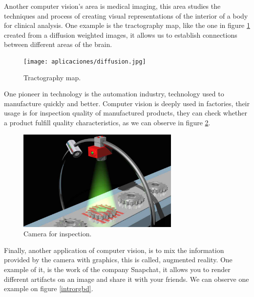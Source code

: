 Another computer vision's area is medical imaging, this area studies the techniques and process of creating visual representations of the interior of a body for clinical analysis. One example is the tractography map, like the one in figure \ref{introTractog} created from a diffusion weighted images, it allows us to establish connections between different areas of the brain.

\begin{figure}[H]
\centering         
\texttt{[image: aplicaciones/diffusion.jpg]}
\caption{Tractography map.} \label{introTractog}
\end{figure}


One pioneer in technology is the automation industry, technology used to manufacture quickly and better. Computer vision is deeply used in factories, their usage is for inspection quality of manufactured products, they can check whether a product fulfill quality characteristics, as we can observe in figure \ref{introFactory}.

\begin{figure}[H]
\centering         
\includegraphics[width=8cm]{aplicaciones/factory.jpg}
\caption{Camera for inspection.} \label{introFactory}
\end{figure}

%

Finally, another application of computer vision, is to mix the information provided by the camera with graphics, this is called, augmented reality. One example of it, is the work of the company Snapchat, it allows you to render different artifacts on an image and share it with your friends. We can observe one example on figure \ref{introrgbd}.

